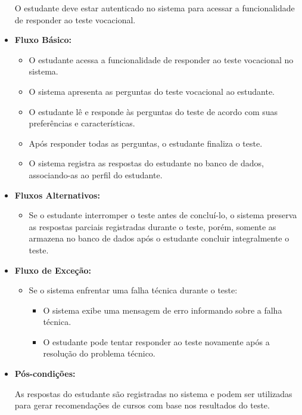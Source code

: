 \begin{itemize}
    O estudante deve estar autenticado no sistema para acessar a funcionalidade de responder ao teste vocacional.
    \item \textbf{Fluxo Básico:}
    \begin{itemize}
        \item O estudante acessa a funcionalidade de responder ao teste vocacional no sistema.
        \item O sistema apresenta as perguntas do teste vocacional ao estudante.
        \item O estudante lê e responde às perguntas do teste de acordo com suas preferências e características.
        \item Após responder todas as perguntas, o estudante finaliza o teste.
        \item O sistema registra as respostas do estudante no banco de dados, associando-as ao perfil do estudante.
    \end{itemize}
    \item \textbf{Fluxos Alternativos:}
    \begin{itemize}
        \item Se o estudante interromper o teste antes de concluí-lo, o sistema preserva as respostas parciais registradas durante o teste, porém, somente as armazena no banco de dados após o estudante concluir integralmente o teste.
    \end{itemize}
    \item \textbf{Fluxo de Exceção:}
    \begin{itemize}
        \item Se o sistema enfrentar uma falha técnica durante o teste:
        \begin{itemize}
            \item O sistema exibe uma mensagem de erro informando sobre a falha técnica.
            \item O estudante pode tentar responder ao teste novamente após a resolução do problema técnico.
        \end{itemize}
    \end{itemize}
    \item \textbf{Pós-condições:}

    As respostas do estudante são registradas no sistema e podem ser utilizadas para gerar recomendações de cursos com base nos resultados do teste.
\end{itemize}

